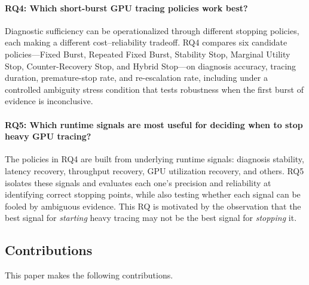 \paragraph{RQ4: Which short-burst GPU tracing policies work best?}
Diagnostic sufficiency can be operationalized through different stopping policies, each
making a different cost--reliability tradeoff. RQ4 compares six candidate policies---Fixed
Burst, Repeated Fixed Burst, Stability Stop, Marginal Utility Stop, Counter-Recovery Stop,
and Hybrid Stop---on diagnosis accuracy, tracing duration, premature-stop rate, and
re-escalation rate, including under a controlled ambiguity stress condition that tests
robustness when the first burst of evidence is inconclusive.

\paragraph{RQ5: Which runtime signals are most useful for deciding when to stop heavy GPU
tracing?}
The policies in RQ4 are built from underlying runtime signals: diagnosis stability, latency
recovery, throughput recovery, GPU utilization recovery, and others. RQ5 isolates these
signals and evaluates each one's precision and reliability at identifying correct stopping
points, while also testing whether each signal can be fooled by ambiguous evidence. This RQ
is motivated by the observation that the best signal for \emph{starting} heavy tracing may
not be the best signal for \emph{stopping} it.

\subsection{Contributions}

This paper makes the following contributions.

